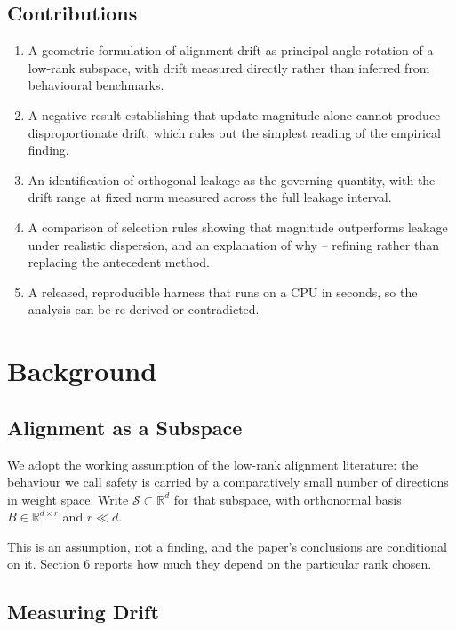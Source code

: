 \documentclass[10pt,twocolumn,letterpaper]{article}
\begin{document}
\subsection{Contributions}


\begin{enumerate}
  \item A geometric formulation of alignment drift as principal-angle rotation of a low-rank subspace, with drift measured directly rather than inferred from behavioural benchmarks.
  \item A negative result establishing that update magnitude alone cannot produce disproportionate drift, which rules out the simplest reading of the empirical finding.
  \item An identification of orthogonal leakage as the governing quantity, with the drift range at fixed norm measured across the full leakage interval.
  \item A comparison of selection rules showing that magnitude outperforms leakage under realistic dispersion, and an explanation of why -- refining rather than replacing the antecedent method.
  \item A released, reproducible harness that runs on a CPU in seconds, so the analysis can be re-derived or contradicted.
\end{enumerate}




\section{Background}



\subsection{Alignment as a Subspace}


We adopt the working assumption of the low-rank alignment literature: the behaviour we call safety is carried by a comparatively small number of directions in weight space. Write $\mathcal{S} \subset \mathbb{R}^{d}$ for that subspace, with orthonormal basis $B \in \mathbb{R}^{d \times r}$ and $r \ll d$.

This is an assumption, not a finding, and the paper's conclusions are conditional on it. Section 6 reports how much they depend on the particular rank chosen.


\subsection{Measuring Drift}
\end{document}
